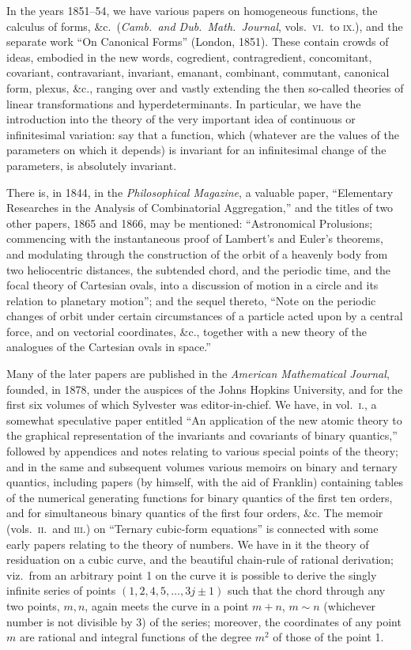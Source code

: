\documentclass[11pt,a4paper]{article}
\begin{document}
In the years 1851--54, we have various papers on homogeneous functions, the calculus of forms, \&c.\ (\emph{Camb.\ and Dub.\ Math.\ Journal}, vols.\ \textsc{vi}.\ to \textsc{ix}.), and the separate work ``On Canonical Forms'' (London, 1851). These contain crowds of ideas, embodied in the new words, cogredient, contragredient, concomitant, covariant, contravariant, invariant, emanant, combinant, commutant, canonical form, plexus, \&c., ranging over and vastly extending the then so-called theories of linear transformations and hyperdeterminants. In particular, we have the introduction into the theory of the very important idea of continuous or infinitesimal variation: say that a function, which (whatever are the values of the parameters on which it depends) is invariant for an infinitesimal change of the parameters, is absolutely invariant.

There is, in 1844, in the \emph{Philosophical Magazine}, a valuable paper, ``Elementary Researches in the Analysis of Combinatorial Aggregation,'' and the titles of two other papers, 1865 and 1866, may be mentioned: ``Astronomical Prolusions; commencing with the instantaneous proof of Lambert's and Euler's theorems, and modulating through the construction of the orbit of a heavenly body from two heliocentric distances, the subtended chord, and the periodic time, and the focal theory of Cartesian ovals, into a discussion of motion in a circle and its relation to planetary motion''; and the sequel thereto, ``Note on the periodic changes of orbit under certain circumstances of a particle acted upon by a central force, and on vectorial coordinates, \&c., together with a new theory of the analogues of the Cartesian ovals in space.''

Many of the later papers are published in the \emph{American Mathematical Journal}, founded, in 1878, under the auspices of the Johns Hopkins University, and for the first six volumes of which Sylvester was editor-in-chief. We have, in vol.\ \textsc{i}., a somewhat speculative paper entitled ``An application of the new atomic theory to the graphical representation of the invariants and covariants of binary quantics,'' followed by appendices and notes relating to various special points of the theory; and in the same and subsequent volumes various memoirs on binary and ternary quantics, including papers (by himself, with the aid of Franklin) containing tables of the numerical generating functions for binary quantics of the first ten orders, and for simultaneous binary quantics of the first four orders, \&c. The memoir (vols.\ \textsc{ii}.\ and \textsc{iii}.) on ``Ternary cubic-form equations'' is connected with some early papers relating to the theory of numbers. We have in it the theory of residuation on a cubic curve, and the beautiful chain-rule of rational derivation; viz.\ from an arbitrary point 1 on the curve it is possible to derive the singly infinite series of points $(1, 2, 4, 5, \ldots, 3j \pm 1)$ such that the chord through any two points, $m, n$, again meets the curve in a point $m + n$, $m \sim n$ (whichever number is not divisible by 3) of the series; moreover, the coordinates of any point $m$ are rational and integral functions of the degree $m^2$ of those of the point 1.
\end{document}
